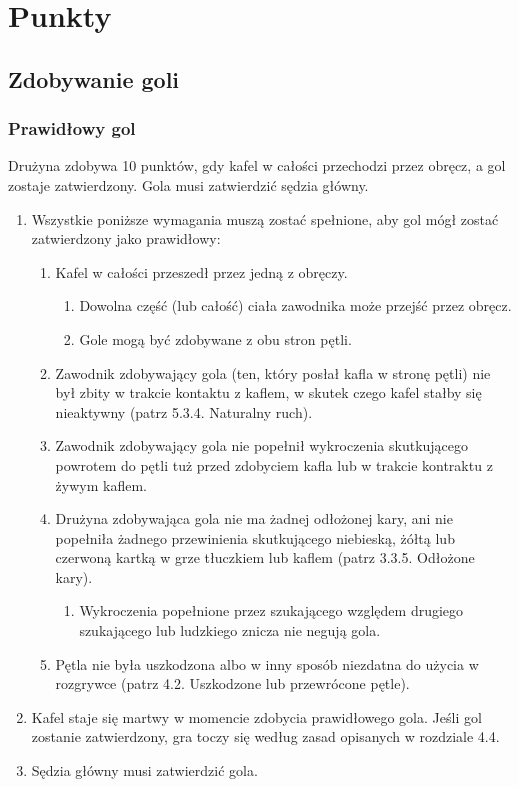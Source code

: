 \documentclass[12pt]{article}
\begin{document}
\pagebreak
\section{Punkty}

\subsection{Zdobywanie goli}

\subsubsection{Prawidłowy gol}
Drużyna zdobywa 10 punktów, gdy kafel w
całości przechodzi przez obręcz, a gol zostaje zatwierdzony. Gola musi
zatwierdzić sędzia główny.

\begin{enumerate}
\item
    Wszystkie poniższe wymagania muszą zostać spełnione, aby gol mógł
  zostać zatwierdzony jako prawidłowy:
  
  \begin{enumerate}
  \item
        Kafel w całości przeszedł przez jedną z obręczy.
    
    \begin{enumerate}
    \item
            Dowolna część (lub całość) ciała zawodnika może przejść przez
      obręcz.
          \item
            Gole mogą być zdobywane z obu stron pętli.
          \end{enumerate}
  \item
        Zawodnik zdobywający gola (ten, który posłał kafla w stronę pętli)
    nie był zbity w trakcie kontaktu z kaflem, w skutek czego kafel
    stałby się nieaktywny (patrz 5.3.4. Naturalny ruch).
      \item
        Zawodnik zdobywający gola nie popełnił wykroczenia skutkującego
    powrotem do pętli tuż przed zdobyciem kafla lub w trakcie kontraktu
    z żywym kaflem.
      \item
        Drużyna zdobywająca gola nie ma żadnej odłożonej kary, ani nie
    popełniła żadnego przewinienia skutkującego niebieską, żółtą lub
    czerwoną kartką w grze tłuczkiem lub kaflem (patrz 3.3.5. Odłożone
    kary).
    
    \begin{enumerate}
    \item
            Wykroczenia popełnione przez szukającego względem drugiego
      szukającego lub ludzkiego znicza nie negują gola.
          \end{enumerate}
  \item
        Pętla nie była uszkodzona albo w inny sposób niezdatna do użycia w
    rozgrywce (patrz 4.2. Uszkodzone lub przewrócone pętle).
      \end{enumerate}
\item
    Kafel staje się martwy w momencie zdobycia prawidłowego gola. Jeśli
  gol zostanie zatwierdzony, gra toczy się według zasad opisanych w
  rozdziale 4.4.
  \item
    Sędzia główny musi zatwierdzić gola.
  

\end{enumerate}
\end{document}
